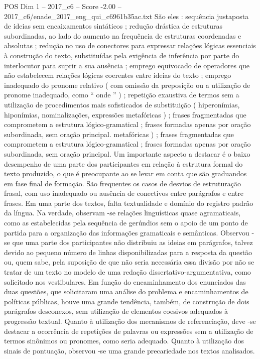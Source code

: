 \begin{textsample}{POS Dim 1 – 2017\_c6 – Score -2.00 – 2017\_c6/enade\_2017\_eng\_qui\_c6961b35ac.txt}
São eles : sequência justaposta de ideias sem encaixamentos sintáticos ; redução drástica de estruturas subordinadas, ao lado do aumento na frequência de estruturas coordenadas e absolutas ; redução no uso de conectores para expressar relações lógicas essenciais à construção do texto, substituídas pela exigência de inferência por parte do interlocutor para suprir a sua ausência ; emprego equivocado de operadores que não estabelecem relações lógicas coerentes entre ideias do texto ; emprego inadequado do pronome relativo ( com omissão da preposição ou a utilização de pronome inadequado, como “ onde ” ) ; repetição exaustiva de termos sem a utilização de procedimentos mais sofisticados de substituição ( hiperonímias, hiponímias, nominalizações, expressões metafóricas ) ; frases fragmentadas que comprometem a estrutura lógico-gramatical ; frases formadas apenas por oração subordinada, sem oração principal. metafóricas ) ; frases fragmentadas que comprometem a estrutura lógico-gramatical ; frases formadas apenas por oração subordinada, sem oração principal.
Um importante aspecto a destacar é o baixo desempenho de uma parte dos participantes em relação à estrutura formal do texto produzido, o que é preocupante ao se levar em conta que são graduandos em fase final de formação.
São frequentes os casos de desvios de estruturação frasal, com uso inadequado ou ausência de conectivos entre parágrafos e entre frases.
Em uma parte dos textos, falta textualidade e domínio do registro padrão da língua.
Na verdade, observam -se relações linguísticas quase agramaticais, como as estabelecidas pela sequência de gerúndios sem o apoio de um ponto de partida para a organização das informações gramaticais e semânticas.
Observou -se que uma parte dos participantes não distribuiu as ideias em parágrafos, talvez devido ao pequeno número de linhas disponibilizadas para a resposta da questão ou, quem sabe, pela suposição de que não seria necessária essa divisão por não se tratar de um texto no modelo de uma redação dissertativo-argumentativa, como solicitado nos vestibulares.
Em função do encaminhamento dos enunciados das duas questões, que solicitaram uma análise do problema e encaminhamentos de políticas públicas, houve uma grande tendência, também, de construção de dois parágrafos desconexos, sem utilização de elementos coesivos adequados à progressão textual.
Quanto à utilização dos mecanismos de referenciação, deve -se destacar a ocorrência de repetições de palavras ou expressões sem a utilização de termos sinônimos ou pronomes, como seria adequado.
Quanto à utilização dos sinais de pontuação, observou -se uma grande precariedade nos textos analisados.

\end{textsample}
